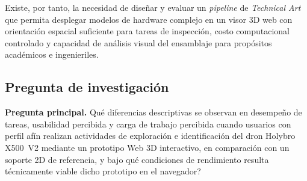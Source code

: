 Existe, por tanto, la necesidad de dise\~nar y evaluar un \textit{pipeline} de \textit{Technical Art} que permita desplegar modelos de hardware complejo en un visor 3D web con orientaci\'on espacial suficiente para tareas de inspecci\'on, costo computacional controlado y capacidad de an\'alisis visual del ensamblaje para prop\'ositos acad\'emicos e ingenieriles.

\subsection{Pregunta de investigaci\'on}

\noindent \textbf{Pregunta principal.} \textquestiondown Qu\'e diferencias descriptivas se observan en desempe\~no de tareas, usabilidad percibida y carga de trabajo percibida cuando usuarios con perfil af\'in realizan actividades de exploraci\'on e identificaci\'on del dron Holybro X500~V2 mediante un prototipo Web 3D interactivo, en comparaci\'on con un soporte 2D de referencia, y bajo qu\'e condiciones de rendimiento resulta t\'ecnicamente viable dicho prototipo en el navegador?

\newpage
